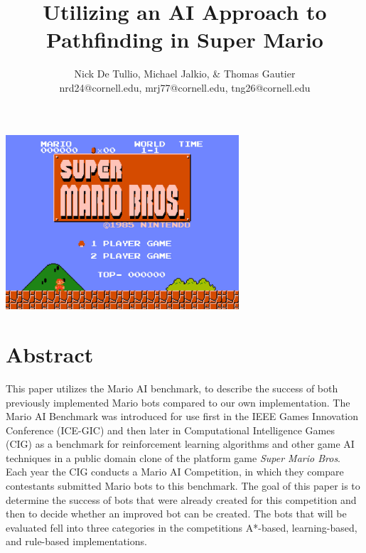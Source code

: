 \documentclass[12pt]{article}
\begin{document}
\title{{\bf \large Utilizing an AI Approach to Pathfinding in Super Mario}\vspace{-2ex}}
\author{{\small Nick De Tullio, Michael Jalkio, \& Thomas Gautier}
\\ {\small nrd24@cornell.edu, mrj77@cornell.edu, tng26@cornell.edu}\vspace{-9ex}}
\date{}

\maketitle
\vspace{-7.5ex}
\begin{center}
\includegraphics[width=0.65\textwidth]{waste_of_space} 
\end{center}
\vspace{-4.5ex}

\section * {Abstract}
This paper utilizes the Mario AI benchmark, to describe the success of both previously implemented Mario bots 
compared to our own implementation. The Mario AI Benchmark was introduced for use first in the IEEE Games 
Innovation Conference (ICE-GIC) and then later in Computational Intelligence Games (CIG) as a benchmark for 
reinforcement learning algorithms and other game AI techniques in a public domain clone of the platform game {\it 
Super Mario Bros}. Each year the CIG conducts a Mario AI Competition, in which they compare contestants 
submitted Mario bots to this benchmark. The goal of this paper is to determine the success of bots that were already 
created for this competition and then to decide whether an improved bot can be created. The bots that will be 
evaluated fell into three categories in the competitions A*-based, learning-based, and rule-based implementations.
\end{document}
